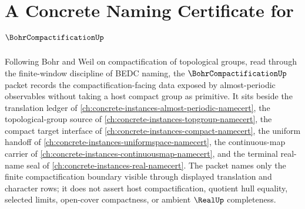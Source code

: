 \chapter{A Concrete Naming Certificate for $\BohrCompactificationUp$}
\label{ch:concrete-instances-bohr-compactification-namecert}

Following Bohr and Weil on compactification of topological groups, read through the finite-window discipline of BEDC naming, the $\BohrCompactificationUp$ packet records the compactification-facing data exposed by almost-periodic observables without taking a host compact group as primitive. It sits beside the translation ledger of \autoref{ch:concrete-instances-almost-periodic-namecert}, the topological-group source of \autoref{ch:concrete-instances-topgroup-namecert}, the compact target interface of \autoref{ch:concrete-instances-compact-namecert}, the uniform handoff of \autoref{ch:concrete-instances-uniformspace-namecert}, the continuous-map carrier of \autoref{ch:concrete-instances-continuousmap-namecert}, and the terminal real-name seal of \autoref{ch:concrete-instances-real-namecert}. The packet names only the finite compactification boundary visible through displayed translation and character rows; it does not assert host compactification, quotient hull equality, selected limits, open-cover compactness, or ambient $\RealUp$ completeness.

